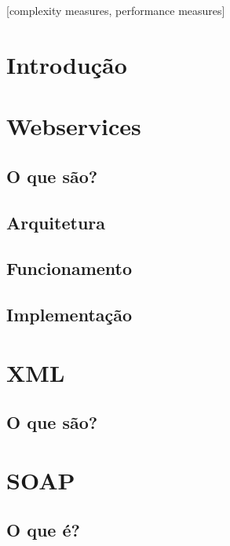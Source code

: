 \documentclass{acm_proc_article-sp}
\begin{document}
[complexity measures, performance measures]



\section{Introdução}

\section{Webservices}

	\subsection{O que são?}
	
	\subsection{Arquitetura}
	
	\subsection{Funcionamento}
	
	\subsection{Implementação}

\section{XML}

	\subsection{O que são?}
	

\section{SOAP}
	\subsection{O que é?}
	
\end{document}

